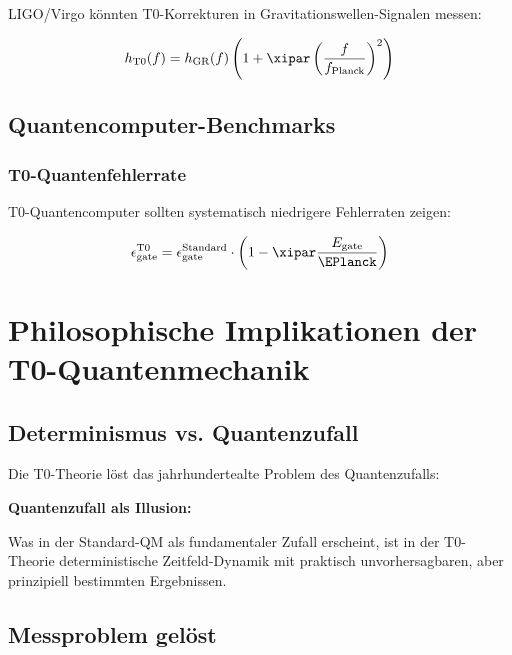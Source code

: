 	LIGO/Virgo könnten T0-Korrekturen in Gravitationswellen-Signalen messen:
	
	\begin{equation}
		h_{\text{T0}}(f) = h_{\text{GR}}(f) \left(1 + \xipar \left(\frac{f}{f_{\text{Planck}}}\right)^2\right)
	\end{equation}
	
	\subsection{Quantencomputer-Benchmarks}
	
	\subsubsection{T0-Quantenfehlerrate}
	
	T0-Quantencomputer sollten systematisch niedrigere Fehlerraten zeigen:
	
	\begin{equation}
		\epsilon_{\text{gate}}^{\text{T0}} = \epsilon_{\text{gate}}^{\text{Standard}} \cdot \left(1 - \xipar \frac{E_{\text{gate}}}{\EPlanck}\right)
	\end{equation}
	
	\section{Philosophische Implikationen der T0-Quantenmechanik}
	
	\subsection{Determinismus vs. Quantenzufall}
	
	Die T0-Theorie löst das jahrhundertealte Problem des Quantenzufalls:
	
	\begin{tcolorbox}[colback=purple!5!white,colframe=purple!75!black,title=T0-Determinismus]
		\textbf{Quantenzufall als Illusion:}
		
		Was in der Standard-QM als fundamentaler Zufall erscheint, ist in der T0-Theorie deterministische Zeitfeld-Dynamik mit praktisch unvorhersagbaren, aber prinzipiell bestimmten Ergebnissen.
		

	\end{tcolorbox}
	
	\subsection{Messproblem gelöst}
	
